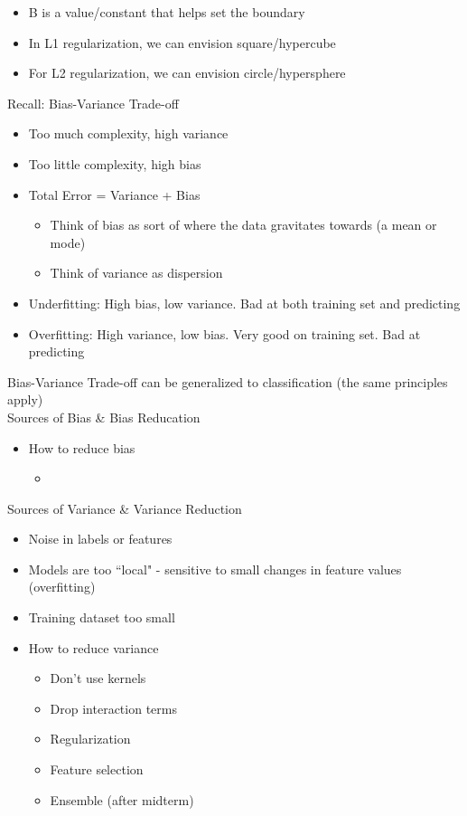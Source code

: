 \documentclass[10pt, oneside]{article}
\begin{document}
\begin{itemize}
\begin{itemize}
\begin{itemize}
\begin{itemize}
                \item B is a value/constant that helps set the boundary
                \item In L1 regularization, we can envision square/hypercube
                \item For L2 regularization, we can envision circle/hypersphere
            \end{itemize}
        \end{itemize}
    \end{itemize}
\end{itemize}

Recall: Bias-Variance Trade-off
\begin{itemize}
    \item Too much complexity, high variance
    \item Too little complexity, high bias
    \item Total Error = Variance + Bias
    \begin{itemize}
        \item Think of bias as sort of where the data gravitates towards (a mean or mode)
        \item Think of variance as dispersion
    \end{itemize}
    \item Underfitting: High bias, low variance. Bad at both training set and predicting
    \item Overfitting: High variance, low bias. Very good on training set. Bad at predicting
\end{itemize}
Bias-Variance Trade-off can be generalized to classification (the same principles apply)\\

Sources of Bias \& Bias Reducation
\begin{itemize}
    \item How to reduce bias
    \begin{itemize}
        \item 
    \end{itemize}
\end{itemize}

Sources of Variance \& Variance Reduction
\begin{itemize}
    \item Noise in labels or features
    \item Models are too ``local" - sensitive to small changes in feature values (overfitting)
    \item Training dataset too small
    \item How to reduce variance
    \begin{itemize}
        \item Don't use kernels
        \item Drop interaction terms
        \item Regularization
        \item Feature selection
        \item Ensemble (after midterm)
    \end{itemize}
\end{itemize}
\end{document}
